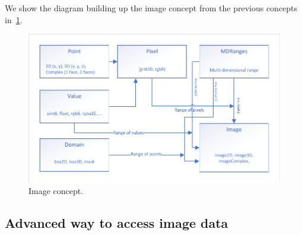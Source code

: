 We show the diagram building up the image concept from the previous concepts in~\cref{fig:concept.image}.

\begin{figure}[htbp]
  \centering
  \includegraphics[width=.99\linewidth]{../figures/concepts/image}
  \caption{Image concept.}
  \label{fig:concept.image}
\end{figure}


\subsection{Advanced way to access image data}
\label{subsec:advanced}

